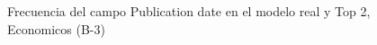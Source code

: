 \begin{figure}[H]
    \centering
    
    \caption{Frecuencia del campo Publication date en el modelo real y Top 2, Economicos (B-3)}
    \label{frecuency-Publication Date-top2}
\end{figure}